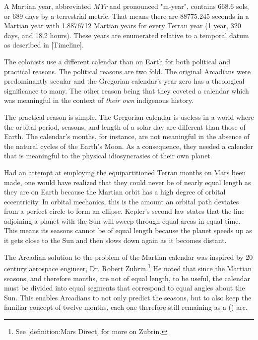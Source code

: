 A Martian year, abbreviated {\it MYr} and pronounced "m-year", contains 668.6 sols, or 689 days by a terrestrial metric. That means there are 88775.245 seconds in a Martian year with 1.8876712 Martian years for every Terran year (1 year, 320 days, and 18.2 hours). These years are enumerated relative to a temporal datum as described in [Timeline].


The colonists use a different calendar than on Earth for both political and practical reasons. The political reasons are two fold. The original Arcadians were predominantly secular and the Gregorian calendar's year zero has a theological significance to many. The other reason being that they coveted a calendar which was meaningful in the context of {\it their own} indigenous history.

The practical reason is simple. The Gregorian calendar is useless in a world where the orbital period, seasons, and length of a solar day are different than those of Earth. The calendar's months, for instance, are not meaningful in the absence of the natural cycles of the Earth's Moon. As a consequence, they needed a calender that is meaningful to the physical idiosyncrasies of their own planet.

Had an attempt at employing the equipartitioned Terran months on Mars been made, one would have realized that they could never be of nearly equal length as they are on Earth because the Martian orbit has a high degree of orbital eccentricity. In orbital mechanics, this is the amount an orbital path deviates from a perfect circle to form an ellipse. Kepler's second law states that the line adjoining a planet with the Sun will sweep through equal areas in equal time. This means its seasons cannot be of equal length because the planet speeds up as it gets close to the Sun and then slows down again as it becomes distant.

The Arcadian solution to the problem of the Martian calendar was inspired by 20 century aerospace engineer, Dr. Robert Zubrin.\footnote{See [definition:Mars Direct] for more on Zubrin.} He noted that since the Martian seasons, and therefore months, are not of equal length, to be useful, the calendar must be divided into equal segments that correspond to equal angles about the Sun. This enables Arcadians to not only predict the seasons, but to also keep the familiar concept of twelve months, each one therefore still remaining as a  () arc. 

